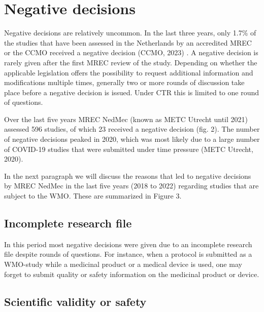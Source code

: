 \documentclass[authordate, meta]{jote-new-article}
\begin{document}
\section{Negative decisions}



Negative decisions are relatively uncommon. In the last three years, only 1.7\% of the studies that have been assessed in the Netherlands by an accredited MREC or the CCMO received a negative decision (CCMO, 2023) . A negative decision is rarely given after the first MREC review of the study. Depending on whether the applicable legislation offers the possibility to request additional information and modifications multiple times, generally two or more rounds of discussion take place before a negative decision is issued. Under CTR this is limited to one round of questions.







Over the last five years MREC NedMec (known as METC Utrecht until 2021) assessed 596 studies, of which 23 received a negative decision (fig. 2). The number of negative decisions peaked in 2020, which was most likely due to a large number of COVID-19 studies that were submitted under time pressure (METC Utrecht, 2020).



In the next paragraph we will discuss the reasons that led to negative decisions by MREC NedMec in the last five years (2018 to 2022) regarding studies that are subject to the WMO. These are summarized in Figure 3.







\subsection{Incomplete research file}



In this period most negative decisions were given due to an incomplete research file despite rounds of questions. For instance, when a protocol is submitted as a WMO-study while a medicinal product or a medical device is used, one may forget to submit quality or safety information on the medicinal product or device.







\subsection{Scientific validity or safety}
\end{document}
